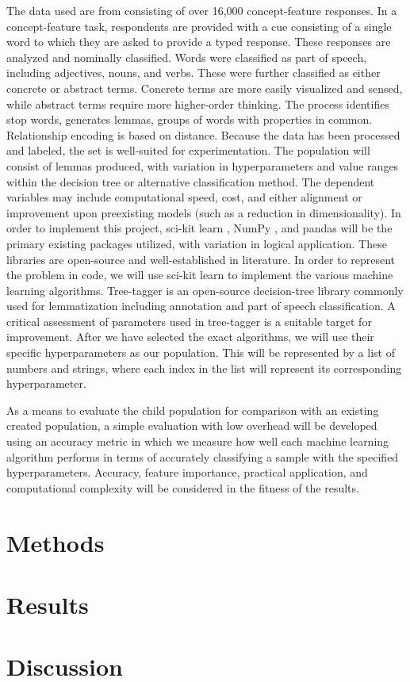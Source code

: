 \documentclass{article}
\begin{document}
The data used are from \citep{buchanan_dedeyne_montefinese_2019} consisting of over 16,000 concept-feature responses. In a concept-feature task, respondents are provided with a cue consisting of a single word to which they are asked to provide a typed response. These responses are analyzed and nominally classified. Words were classified as part of speech, including adjectives, nouns, and verbs. These were further classified as either concrete or abstract terms. Concrete terms are more easily visualized and sensed, while abstract terms require more higher-order thinking. The process identifies stop words, generates lemmas, groups of words with properties in common. Relationship encoding is based on distance. Because the data has been processed and labeled, the set is well-suited for experimentation.  
The population will consist of lemmas produced, with variation in hyperparameters and value ranges within the decision tree or alternative classification method. The dependent variables may include computational speed, cost, and either alignment or improvement upon preexisting models (such as a reduction in dimensionality). In order to implement this project, sci-kit learn \citep{pedregosa2011scikit}, NumPy \citep{oliphant2006guide}, and pandas \citep{mckinney2010data} will be the primary existing packages utilized, with variation in logical application. These libraries are open-source and well-established in literature. In order to represent the problem in code, we will use sci-kit learn to implement the various machine learning algorithms. Tree-tagger is an open-source decision-tree library commonly used for lemmatization including annotation and part of speech classification. A critical assessment of parameters used in tree-tagger is a suitable target for improvement. After we have selected the exact algorithms, we will use their specific hyperparameters as our population. This will be represented by a list of numbers and strings, where each index in the list will represent its corresponding hyperparameter.  

As a means to evaluate the child population for comparison with an existing created population, a simple evaluation with low overhead will be developed using an accuracy metric in which we measure how well each machine learning algorithm performs in terms of accurately classifying a sample with the specified hyperparameters. Accuracy, feature importance, practical application, and computational complexity will be considered in the fitness of the results. 

\section{Methods}

\section{Results}

\section{Discussion}



\end{document}
